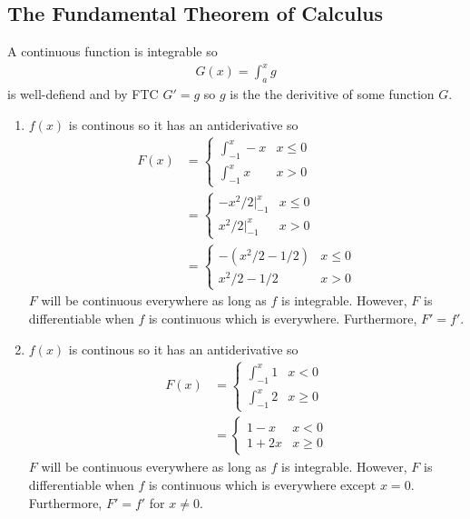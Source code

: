 \subsection{The Fundamental Theorem of Calculus}

A continuous function is integrable so 
\begin{align*}
    G(x) = \int_a^x g
\end{align*}
is well-defiend and by FTC $G'=g$ so $g$ is the 
the derivitive of some function $G$.

\begin{enumerate}[label=(\alph*)]
    \item 
    $f(x)$ is continous so it has an antiderivative so 
    \begin{align*}
        F(x) &= \begin{cases}
            \int_{-1}^x -x & x\leq 0 \\
            \int_{-1}^x x & x> 0
        \end{cases} \\
        &= \begin{cases}
            -x^2/2|_{-1}^x & x\leq 0 \\
            x^2/2|_{-1}^x & x> 0
        \end{cases} \\
        &= \begin{cases}
            -(x^2/2-1/2) & x\leq 0 \\
            x^2/2-1/2 & x> 0
        \end{cases}
    \end{align*}
    $F$ will be continuous everywhere as long as $f$ is 
    integrable. However, $F$ is differentiable when 
    $f$ is continuous which is everywhere. Furthermore, 
    $F'=f'$.

    \item
    $f(x)$ is continous so it has an antiderivative so 
    \begin{align*}
        F(x) &= \begin{cases}
           \int_{-1}^x 1 & x < 0 \\
           \int_{-1}^x 2 & x \geq 0
        \end{cases} \\
        &= \begin{cases}
            1-x & x < 0 \\
            1+2x & x \geq 0
        \end{cases}
    \end{align*}
    $F$ will be continuous everywhere as long as $f$ is 
    integrable. However, $F$ is differentiable when 
    $f$ is continuous which is everywhere except $x=0$. 
    Furthermore, 
    $F'=f'$ for $x\neq 0$.
\end{enumerate}

